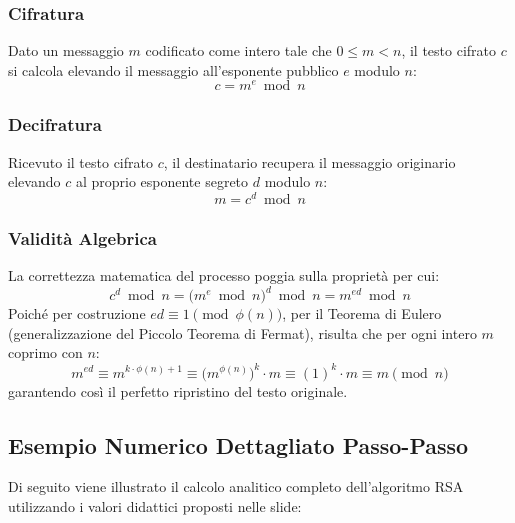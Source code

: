 \documentclass[11pt, a4paper]{article}
\begin{document}
\subsubsection{Cifratura}
Dato un messaggio $m$ codificato come intero tale che $0 \le m < n$, il testo cifrato $c$ si calcola elevando il messaggio all'esponente pubblico $e$ modulo $n$:
\begin{equation}
\boxed{c = m^e \bmod n}
\end{equation}

\subsubsection{Decifratura}
Ricevuto il testo cifrato $c$, il destinatario recupera il messaggio originario elevando $c$ al proprio esponente segreto $d$ modulo $n$:
\begin{equation}
\boxed{m = c^d \bmod n}
\end{equation}

\subsubsection{Validità Algebrica}
La correttezza matematica del processo poggia sulla proprietà per cui:
\[
c^d \bmod n = \bigl(m^e \bmod n\bigr)^d \bmod n = m^{ed} \bmod n
\]
Poiché per costruzione $ed \equiv 1 \pmod{\phi(n)}$, per il Teorema di Eulero (generalizzazione del Piccolo Teorema di Fermat), risulta che per ogni intero $m$ coprimo con $n$:
\[
m^{ed} \equiv m^{k \cdot \phi(n) + 1} \equiv \bigl(m^{\phi(n)}\bigr)^k \cdot m \equiv (1)^k \cdot m \equiv m \pmod n
\]
garantendo così il perfetto ripristino del testo originale.

\subsection{Esempio Numerico Dettagliato Passo-Passo}

Di seguito viene illustrato il calcolo analitico completo dell'algoritmo RSA utilizzando i valori didattici proposti nelle slide:

\end{document}
